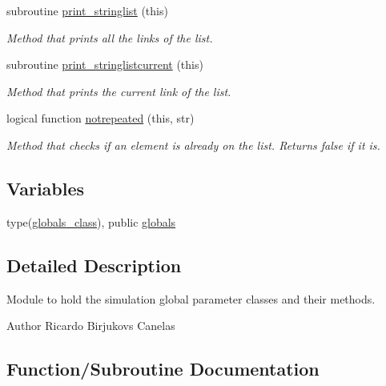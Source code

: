 \begin{DoxyCompactItemize}
subroutine \mbox{\hyperlink{namespacesimulationglobals__mod_a7adb33aaa9ea0a94c38789c07ff3e787}{print\+\_\+stringlist}} (this)
\begin{DoxyCompactList}\small\item\em Method that prints all the links of the list. \end{DoxyCompactList}\item 
subroutine \mbox{\hyperlink{namespacesimulationglobals__mod_a405f70548e38f0af65d4cbdb7c7025a4}{print\+\_\+stringlistcurrent}} (this)
\begin{DoxyCompactList}\small\item\em Method that prints the current link of the list. \end{DoxyCompactList}\item 
logical function \mbox{\hyperlink{namespacesimulationglobals__mod_a12410ee549ead4c6d892dca6ead74d15}{notrepeated}} (this, str)
\begin{DoxyCompactList}\small\item\em Method that checks if an element is already on the list. Returns false if it is. \end{DoxyCompactList}\end{DoxyCompactItemize}
\subsection*{Variables}
\begin{DoxyCompactItemize}
\item 
type(\mbox{\hyperlink{structsimulationglobals__mod_1_1globals__class}{globals\+\_\+class}}), public \mbox{\hyperlink{namespacesimulationglobals__mod_acf1e2786d81bd0fe337a8458efce8733}{globals}}
\end{DoxyCompactItemize}


\subsection{Detailed Description}
Module to hold the simulation global parameter classes and their methods. 

\begin{DoxyAuthor}{Author}
Ricardo Birjukovs Canelas 
\end{DoxyAuthor}


\subsection{Function/\+Subroutine Documentation}
\mbox{\label{namespacesimulationglobals__mod_afd372c5764a180f9029d4dc3cddce94d}} 
